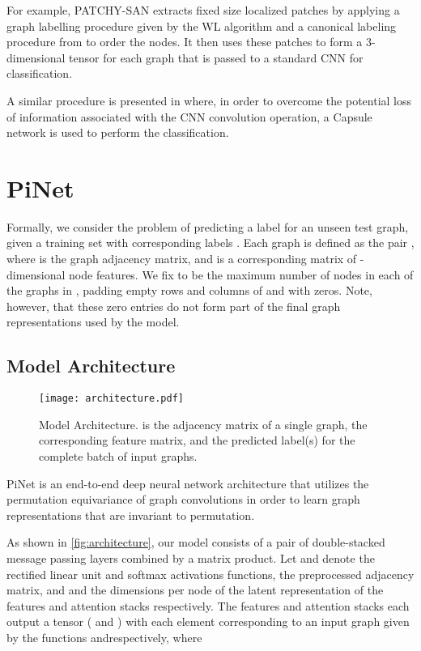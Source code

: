 \documentclass{article}
\theoremstyle{definition}
\begin{document}
For example, PATCHY-SAN \cite{Niepert2016} extracts fixed size localized patches by applying a graph labelling procedure given by the WL algorithm \cite{Weisfeiler1968} and a canonical labeling procedure from \cite{Mckay2013} to order the nodes. It then uses these patches to form a 3-dimensional tensor for each graph that is passed to a standard CNN for classification.

A similar procedure is presented in \cite{Daniel2019} where, in order to overcome the potential loss of information associated with the CNN convolution operation, a Capsule network is used to perform the classification. 


\section{PiNet}

Formally, we consider the problem of predicting a label  for an unseen test graph, given a training set  with corresponding labels . Each graph  is defined as the pair , where  is the graph adjacency matrix, and  is a corresponding matrix of -dimensional node features. We fix  to be the maximum number of nodes in each of the graphs in , padding empty rows and columns of  and  with zeros. Note, however, that these zero entries do not form part of the final graph representations used by the model.

\subsection{Model Architecture}

\begin{figure}[htb]
  \centering
  \texttt{[image: architecture.pdf]}
  \caption{Model Architecture.  is the  adjacency matrix of a single graph,  the corresponding feature matrix, and  the predicted label(s) for the complete batch of input graphs.}
  \label{fig:architecture}
\end{figure}

PiNet is an end-to-end deep neural network architecture that utilizes the permutation equivariance of graph convolutions in order to learn graph representations that are invariant to permutation.

As shown in \autoref{fig:architecture}, our model consists of a pair of double-stacked message passing layers combined by a matrix product. Let  and  denote the rectified linear unit and softmax activations functions,  the preprocessed adjacency matrix, and \small\normalsize and \small\normalsize the dimensions per node of the latent representation of the features and attention stacks respectively. The features and attention stacks each output a tensor ( and ) with each element corresponding to an input graph given by the functions \small\normalsize and\small \normalsize respectively, where
\end{document}
